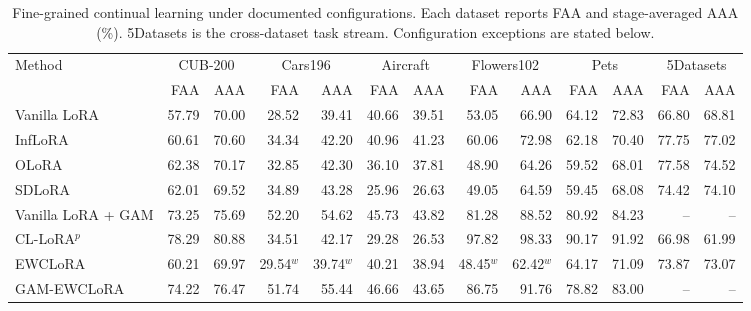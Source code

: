 \begin{table}[t]
\centering
\caption{Fine-grained continual learning under documented configurations. Each dataset reports FAA and stage-averaged AAA (\%). 5Datasets is the cross-dataset task stream. Configuration exceptions are stated below.}
\label{tab:exp_fine_expanded}
\scriptsize\setlength{\tabcolsep}{2.2pt}\renewcommand{\arraystretch}{1.08}
\begin{tabular*}{\linewidth}{@{\extracolsep{\fill}}l*{12}{r}@{}}
\toprule
Method & \multicolumn{2}{c}{CUB-200} & \multicolumn{2}{c}{Cars196} & \multicolumn{2}{c}{Aircraft} & \multicolumn{2}{c}{Flowers102} & \multicolumn{2}{c}{Pets} & \multicolumn{2}{c}{5Datasets}\\
\cmidrule(lr){2-3}\cmidrule(lr){4-5}\cmidrule(lr){6-7}\cmidrule(lr){8-9}\cmidrule(lr){10-11}\cmidrule(lr){12-13}
 & FAA & AAA & FAA & AAA & FAA & AAA & FAA & AAA & FAA & AAA & FAA & AAA\\\midrule
Vanilla LoRA & 57.79 & 70.00 & 28.52 & 39.41 & 40.66 & 39.51 & 53.05 & 66.90 & 64.12 & 72.83 & 66.80 & 68.81\\
InfLoRA & 60.61 & 70.60 & 34.34 & 42.20 & 40.96 & 41.23 & 60.06 & 72.98 & 62.18 & 70.40 & 77.75 & 77.02\\
OLoRA & 62.38 & 70.17 & 32.85 & 42.30 & 36.10 & 37.81 & 48.90 & 64.26 & 59.52 & 68.01 & 77.58 & 74.52\\
SDLoRA & 62.01 & 69.52 & 34.89 & 43.28 & 25.96 & 26.63 & 49.05 & 64.59 & 59.45 & 68.08 & 74.42 & 74.10\\
Vanilla LoRA + GAM & 73.25 & 75.69 & 52.20 & 54.62 & 45.73 & 43.82 & 81.28 & 88.52 & 80.92 & 84.23 & -- & --\\
CL-LoRA$^{p}$ & 78.29 & 80.88 & 34.51 & 42.17 & 29.28 & 26.53 & 97.82 & 98.33 & 90.17 & 91.92 & 66.98 & 61.99\\
EWCLoRA & 60.21 & 69.97 & 29.54$^{w}$ & 39.74$^{w}$ & 40.21 & 38.94 & 48.45$^{w}$ & 62.42$^{w}$ & 64.17 & 71.09 & 73.87 & 73.07\\
GAM-EWCLoRA & 74.22 & 76.47 & 51.74 & 55.44 & 46.66 & 43.65 & 86.75 & 91.76 & 78.82 & 83.00 & -- & --\\
\bottomrule\end{tabular*}
\par\vspace{3pt}\begin{minipage}{\linewidth}\scriptsize

\end{minipage}
\end{table}
